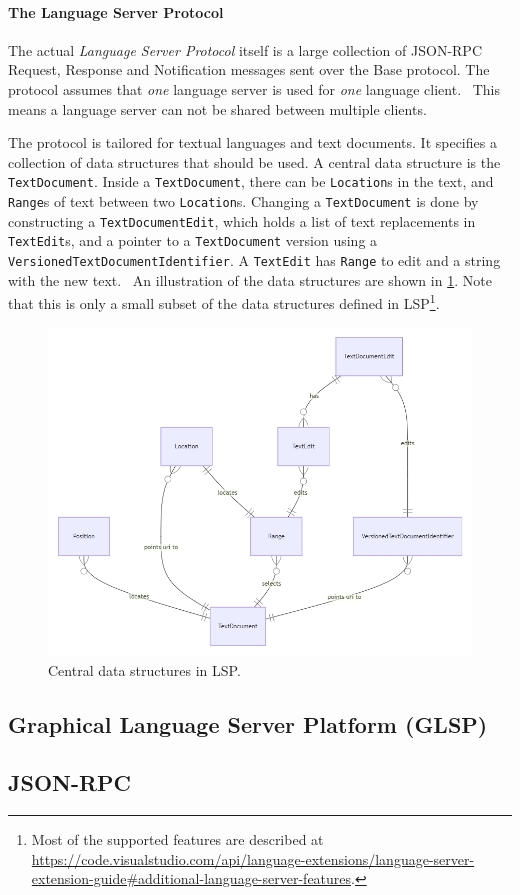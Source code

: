 \paragraph*{The Language Server Protocol}
The actual \emph{Language Server Protocol} itself is a large collection of \gls{JSON-RPC} Request, Response and Notification messages sent over the Base protocol.
The protocol assumes that \textit{one} language server is used for \textit{one} language client.~\cite{microsoftLanguageServerProtocol2020}
This means a language server can not be shared between multiple clients.

The protocol is tailored for textual languages and text documents.
It specifies a collection of data structures that should be used.
A central data structure is the \texttt{TextDocument}.
Inside a \texttt{TextDocument}, there can be \texttt{Location}s in the text, and \texttt{Range}s of text between two \texttt{Location}s.
Changing a \texttt{TextDocument} is done by constructing a \texttt{TextDocumentEdit}, which holds a list of text replacements in \texttt{TextEdit}s, and a pointer to a \texttt{TextDocument} version using a \texttt{VersionedTextDocumentIdentifier}.
A \texttt{TextEdit} has \texttt{Range} to edit and a string with the new text.~\cite{microsoftLanguageServerProtocol2020}
An illustration of the data structures are shown in \cref{fig:lsp-data-structures}.
Note that this is only a small subset of the data structures defined in \gls{LSP}\footnote{Most of the supported features are described at \href{https://code.visualstudio.com/api/language-extensions/language-server-extension-guide\#additional-language-server-features}{https://code.visualstudio.com/api/language-extensions/language-server-extension-guide\#additional-language-server-features}.}.

\begin{figure}[htbp]
  \centering
  \includegraphics[width=\textwidth]{figures/lsp-textdocument-data}
  \caption[LSP Central Data Structures]{Central data structures in \gls{LSP}.}\label{fig:lsp-data-structures}
\end{figure}


\subsection{Graphical Language Server Platform (GLSP)}\label{sec:glsp}


\subsection{JSON-RPC}
